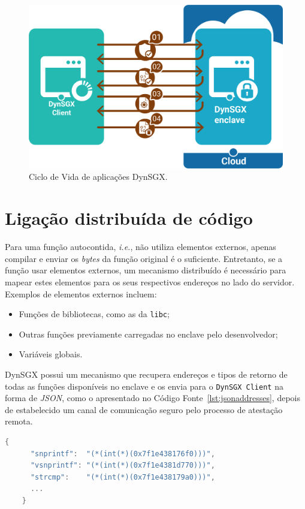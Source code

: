 \begin{figure}
    \centering
    \includegraphics[width=5in]{img/software-lifecycle}
    \caption{Ciclo de Vida de aplicações DynSGX.}
    \label{fig:softwareLifecycle}
\end{figure}

\section{Ligação distribuída de código}
\label{sec:dynsgx_distributed_linking}

Para uma função autocontida, \textit{i.e.}, não utiliza elementos externos,
apenas compilar e enviar os \textit{bytes} da função original é o suficiente.
Entretanto, se a função usar elementos externos, um mecanismo distribuído é
necessário para mapear estes elementos para os seus respectivos endereços no
lado do servidor. Exemplos de elementos externos incluem:
\begin{itemize}
    \item Funções de bibliotecas, como as da \texttt{libc};
    \item Outras funções previamente carregadas no enclave pelo desenvolvedor;
    \item Variáveis globais.
\end{itemize}
DynSGX possui um mecanismo que recupera endereços e tipos de retorno de todas as
funções disponíveis no enclave e os envia para o \texttt{DynSGX Client} na forma
de \textit{JSON}, como o apresentado no Código Fonte~\ref{lst:jsonaddresses},
depois de estabelecido um canal de comunicação seguro pelo processo de atestação
remota.

\begin{lstlisting}[language=C, label=lst:jsonaddresses, caption={Exemplo de
\textit{JSON} contendo o mapeamento de elementos externos para seus respectivos
endereços, que podem ser usados por outras funções.}]
    {
      "snprintf":  "(*(int(*)(0x7f1e438176f0)))",
      "vsnprintf": "(*(int(*)(0x7f1e4381d770)))",
      "strcmp":    "(*(int(*)(0x7f1e438179a0)))",
      ...
    }
\end{lstlisting}

